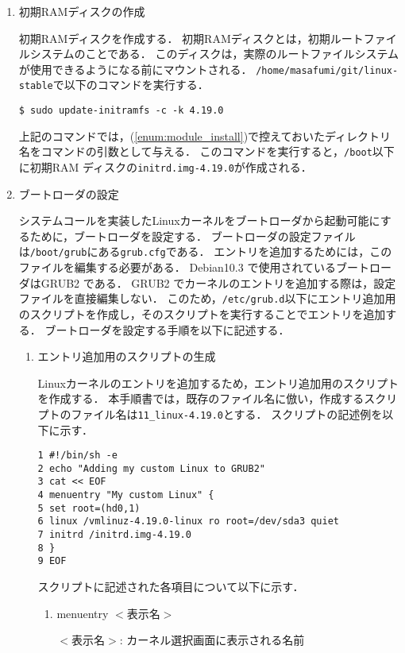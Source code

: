 \documentclass[12pt]{jsarticle}
\begin{document}
\begin{enumerate}
\item\label{enum:make_disc} 初期RAMディスクの作成

  初期RAMディスクを作成する．
  初期RAMディスクとは，初期ルートファイルシステムのことである．
  このディスクは，実際のルートファイルシステムが使用できるようになる前にマウントされる．
  \verb|/home/masafumi/git/linux-stable|で以下のコマンドを実行する．
\begin{verbatim}
$ sudo update-initramfs -c -k 4.19.0
\end{verbatim}
上記のコマンドでは，(\ref{enum:module_install})で控えておいたディレクトリ名をコマンドの引数として与える．
このコマンドを実行すると，\verb|/boot|以下に初期RAM ディスクの\verb|initrd.img-4.19.0|が作成される．

\item\label{enum:bootloader} ブートローダの設定

  システムコールを実装したLinuxカーネルをブートローダから起動可能にするために，ブートローダを設定する．
  ブートローダの設定ファイルは\verb|/boot/grub|にある\verb|grub.cfg|である．
  エントリを追加するためには，このファイルを編集する必要がある．
  Debian10.3 で使用されているブートローダはGRUB2 である．
  GRUB2 でカーネルのエントリを追加する際は，設定ファイルを直接編集しない．
  このため，\verb|/etc/grub.d|以下にエントリ追加用のスクリプトを作成し，そのスクリプトを実行することでエントリを追加する．
  ブートローダを設定する手順を以下に記述する．

  \begin{enumerate}
  \item エントリ追加用のスクリプトの生成

    Linuxカーネルのエントリを追加するため，エントリ追加用のスクリプトを作成する．
    本手順書では，既存のファイル名に倣い，作成するスクリプトのファイル名は\verb|11_linux-4.19.0|とする．
    スクリプトの記述例を以下に示す．

\begin{verbatim}
1 #!/bin/sh -e
2 echo "Adding my custom Linux to GRUB2"
3 cat << EOF
4 menuentry "My custom Linux" {
5 set root=(hd0,1)
6 linux /vmlinuz-4.19.0-linux ro root=/dev/sda3 quiet
7 initrd /initrd.img-4.19.0
8 }
9 EOF
\end{verbatim}
スクリプトに記述された各項目について以下に示す．

\begin{enumerate}
\item menuentry $<$表示名$>$

  $<$表示名$>$: カーネル選択画面に表示される名前
  

\end{enumerate}
\end{enumerate}
\end{enumerate}
\end{document}
